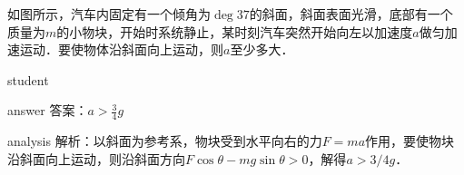 \begin{example}
	如图所示，汽车内固定有一个倾角为$ \deg{37} $的斜面，斜面表面光滑，底部有一个质量为$ m $的小物块，开始时系统静止，某时刻汽车突然开始向左以加速度$ a $做匀加速运动．要使物体沿斜面向上运动，则$ a $至少多大．
	
	\begin{taggedblock}{student}
		\vspace*{2cm}
	\end{taggedblock}
	
	
	\begin{taggedblock}{answer}
		答案：$ a>\frac{3}{4}g $
	\end{taggedblock}
	
	
	\begin{taggedblock}{analysis}
		解析：以斜面为参考系，物块受到水平向右的力$ F=ma $作用，要使物块沿斜面向上运动，则沿斜面方向$ F\cos\theta-mg\sin\theta>0 $，解得$a>3/4 g$．
	\end{taggedblock}
\end{example}


